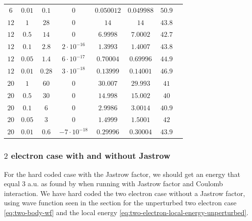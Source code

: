 \documentclass[11pt]{article}
\begin{document}
\begin{table}[H]
\begin{tabular}{c c c c c c c c}
		$              6$ &$           0.01$ &$            0.1$ &$              0$ &$       0.050012$ &$       0.049988$ & $           50.9$ \\ 
		$             12$ &$              1$ &$             28$ &$              0$ &$             14$ &$             14$ & $           43.8$ \\ 
		$             12$ &$            0.5$ &$             14$ &$              0$ &$         6.9998$ &$         7.0002$ & $           42.7$ \\ 
		$             12$ &$            0.1$ &$            2.8$ &$2\cdot 10^{-16}$ &$         1.3993$ &$         1.4007$ & $           43.8$ \\ 
		$             12$ &$           0.05$ &$            1.4$ &$6\cdot 10^{-17}$ &$        0.70004$ &$        0.69996$ & $           44.9$ \\ 
		$             12$ &$           0.01$ &$           0.28$ &$3\cdot 10^{-18}$ &$        0.13999$ &$        0.14001$ & $           46.9$ \\ 
		$             20$ &$              1$ &$             60$ &$              0$ &$         30.007$ &$         29.993$ & $             41$ \\ 
		$             20$ &$            0.5$ &$             30$ &$              0$ &$         14.998$ &$         15.002$ & $             40$ \\ 
		$             20$ &$            0.1$ &$              6$ &$              0$ &$         2.9986$ &$         3.0014$ & $           40.9$ \\ 
		$             20$ &$           0.05$ &$              3$ &$              0$ &$         1.4999$ &$         1.5001$ & $             42$ \\ 
		$             20$ &$           0.01$ &$            0.6$ &$-7\cdot10^{-18}$ &$        0.29996$ &$        0.30004$ & $           43.9$ \\ 
		\hline \hline
	\end{tabular}
	\label{tab:unperturbed-energies}
\end{table}

\subsubsection{\texorpdfstring{$2$}{a} electron case with and without Jastrow}
For the hard coded case with the Jastrow factor, we should get an energy that equal 3 a.u. as found by \citet{PhysRevA.48.3561} when running with Jastrow factor and Coulomb interaction. We have hard coded the two electron case without a Jastrow factor, using wave function seen in the section for the unperturbed two electron case \eqref{eq:two-body-wf} and the local energy \eqref{eq:two-electron-local-energy-unperturbed}. 
\end{document}
